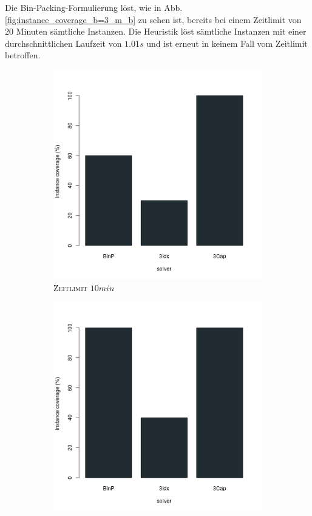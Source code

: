 Die Bin-Packing-Formulierung löst, wie in Abb. \ref{fig:instance_coverage_b=3_m_b} zu sehen
ist, bereits bei einem Zeitlimit von $20$ Minuten sämtliche Instanzen.
Die Heuristik löst sämtliche Instanzen mit einer durchschnittlichen Laufzeit von $1.01s$ und ist erneut
in keinem Fall vom Zeitlimit betroffen.

\begin{figure}[H]
\centering

\begin{subfigure}[b]{0.3\textwidth}
\centering
\includegraphics[width=1.2\textwidth]{img/solver_instance_coverage_b=3_m_600s.png}
\caption{\textsc{Zeitlimit} $10min$}
\label{fig:instance_coverage_b=3_m_a}
\end{subfigure}
\hfill
\begin{subfigure}[b]{0.3\textwidth}
\centering
\includegraphics[width=1.2\textwidth]{img/solver_instance_coverage_b=3_m_1200s.png}

\end{subfigure}
\end{figure}
